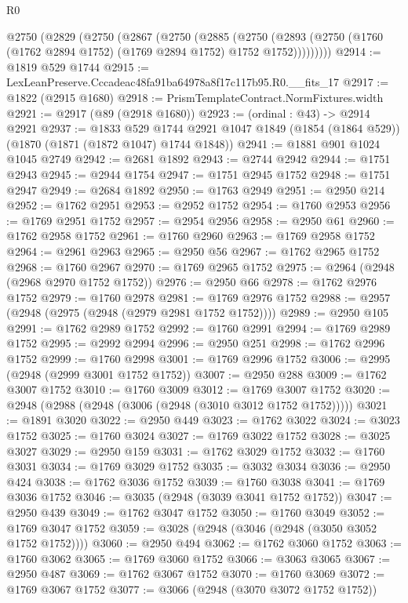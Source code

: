 \begin{lexlean}{R0}
\begin{coremodule}
  @2750
    (@2829
      (@2750
        (@2867
          (@2750
            (@2885
              (@2750
                (@2893 (@2750 (@1760 (@1762 @2894 @1752) (@1769 @2894 @1752) @1752 @1752)))))))))
@2914 := @1819 @529 @1744
@2915 := LexLeanPreserve.Cccadeac48fa91ba64978a8f17c117b95.R0.__fits_17
@2917 := @1822 (@2915 @1680)
@2918 := PrismTemplateContract.NormFixtures.width
@2921 := @2917 (@89 (@2918 @1680))
@2923 := (ordinal : @43) -> @2914 @2921
@2937 := @1833
    @529
    @1744
    @2921
    @1047
    @1849
    (@1854 (@1864 @529))
    (@1870 (@1871 (@1872 @1047) @1744 @1848))
@2941 := @1881 @901 @1024 @1045 @2749
@2942 := @2681 @1892
@2943 := @2744 @2942
@2944 := @1751 @2943
@2945 := @2944 @1754
@2947 := @1751 @2945 @1752
@2948 := @1751 @2947
@2949 := @2684 @1892
@2950 := @1763 @2949
@2951 := @2950 @214
@2952 := @1762 @2951
@2953 := @2952 @1752
@2954 := @1760 @2953
@2956 := @1769 @2951 @1752
@2957 := @2954 @2956
@2958 := @2950 @61
@2960 := @1762 @2958 @1752
@2961 := @1760 @2960
@2963 := @1769 @2958 @1752
@2964 := @2961 @2963
@2965 := @2950 @56
@2967 := @1762 @2965 @1752
@2968 := @1760 @2967
@2970 := @1769 @2965 @1752
@2975 := @2964 (@2948 (@2968 @2970 @1752 @1752))
@2976 := @2950 @66
@2978 := @1762 @2976 @1752
@2979 := @1760 @2978
@2981 := @1769 @2976 @1752
@2988 := @2957 (@2948 (@2975 (@2948 (@2979 @2981 @1752 @1752))))
@2989 := @2950 @105
@2991 := @1762 @2989 @1752
@2992 := @1760 @2991
@2994 := @1769 @2989 @1752
@2995 := @2992 @2994
@2996 := @2950 @251
@2998 := @1762 @2996 @1752
@2999 := @1760 @2998
@3001 := @1769 @2996 @1752
@3006 := @2995 (@2948 (@2999 @3001 @1752 @1752))
@3007 := @2950 @288
@3009 := @1762 @3007 @1752
@3010 := @1760 @3009
@3012 := @1769 @3007 @1752
@3020 := @2948 (@2988 (@2948 (@3006 (@2948 (@3010 @3012 @1752 @1752)))))
@3021 := @1891 @3020
@3022 := @2950 @449
@3023 := @1762 @3022
@3024 := @3023 @1752
@3025 := @1760 @3024
@3027 := @1769 @3022 @1752
@3028 := @3025 @3027
@3029 := @2950 @159
@3031 := @1762 @3029 @1752
@3032 := @1760 @3031
@3034 := @1769 @3029 @1752
@3035 := @3032 @3034
@3036 := @2950 @424
@3038 := @1762 @3036 @1752
@3039 := @1760 @3038
@3041 := @1769 @3036 @1752
@3046 := @3035 (@2948 (@3039 @3041 @1752 @1752))
@3047 := @2950 @439
@3049 := @1762 @3047 @1752
@3050 := @1760 @3049
@3052 := @1769 @3047 @1752
@3059 := @3028 (@2948 (@3046 (@2948 (@3050 @3052 @1752 @1752))))
@3060 := @2950 @494
@3062 := @1762 @3060 @1752
@3063 := @1760 @3062
@3065 := @1769 @3060 @1752
@3066 := @3063 @3065
@3067 := @2950 @487
@3069 := @1762 @3067 @1752
@3070 := @1760 @3069
@3072 := @1769 @3067 @1752
@3077 := @3066 (@2948 (@3070 @3072 @1752 @1752))

\end{coremodule}
\end{lexlean}
